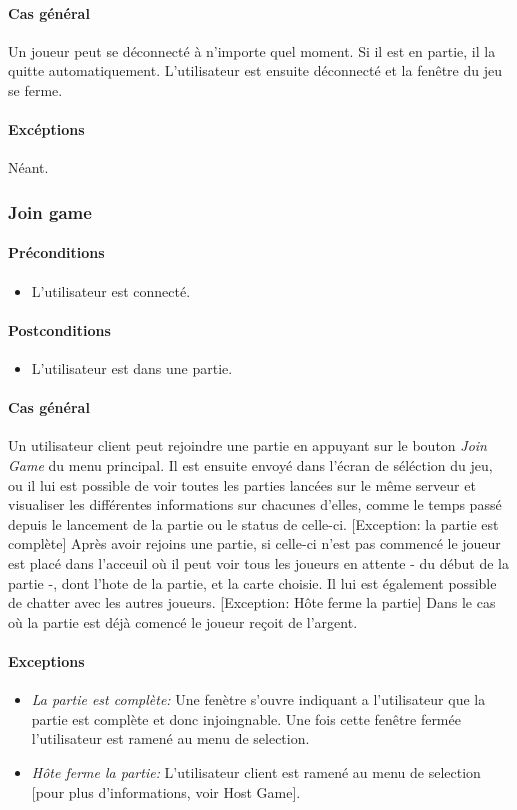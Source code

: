 \documentclass[a4paper,11pt]{report}
\begin{document}
\paragraph{Cas général}
Un joueur peut se déconnecté à n'importe quel moment. Si il est en partie, il la quitte automatiquement. L'utilisateur
est ensuite déconnecté et la fenêtre du jeu se ferme.
\paragraph{Excéptions} Néant.
\subsubsection{Join game}
\paragraph{Préconditions}
\begin{itemize}
 \item L'utilisateur est connecté.
\end{itemize}
\paragraph{Postconditions}
\begin{itemize}
 \item L'utilisateur est dans une partie.
\end{itemize}
\paragraph{Cas général}
Un utilisateur client peut rejoindre une partie en appuyant sur le bouton \og \textit{Join Game} \fg 
du menu principal.
Il est ensuite envoyé dans l'écran de séléction du jeu, ou il lui est possible de voir toutes les parties lancées sur le
même serveur et visualiser les différentes informations sur chacunes d'elles, comme le temps passé depuis le lancement
de la partie ou le status de celle-ci.
[Exception: la partie est complète]
Après avoir rejoins une partie, si celle-ci n'est pas commencé le joueur est placé dans l'acceuil où il peut
voir tous les joueurs en attente - du début de la partie -, dont l'hote de la partie, et la carte choisie. Il lui
est également possible de chatter avec les autres joueurs. 
[Exception: Hôte ferme la partie]
Dans le cas où la partie est déjà comencé le joueur reçoit de l'argent.
\paragraph{Exceptions}
\begin{itemize}
 \item \textit{La partie est complète:} Une fenètre s'ouvre indiquant a l'utilisateur que la partie est complète
 et donc injoingnable. Une fois cette fenêtre fermée l'utilisateur est ramené au menu de selection.
 \item \textit{Hôte ferme la partie:} L'utilisateur client est ramené au menu de selection [pour plus d'informations, voir
 Host Game]. 
\end{itemize}
\end{document}
